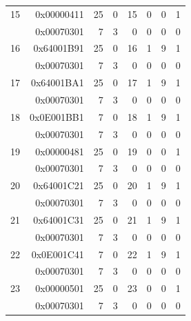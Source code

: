 \begin{longtable}{r r r r r r r r}
15 & 0x00000411 & 25 & 0 & 15 & 0 & 0 & 1 \\
  & 0x00070301 & 7 & 3 & 0 & 0 & 0 & 0 \\
16 & 0x64001B91 & 25 & 0 & 16 & 1 & 9 & 1 \\
  & 0x00070301 & 7 & 3 & 0 & 0 & 0 & 0 \\
17 & 0x64001BA1 & 25 & 0 & 17 & 1 & 9 & 1 \\
  & 0x00070301 & 7 & 3 & 0 & 0 & 0 & 0 \\
18 & 0x0E001BB1 & 7 & 0 & 18 & 1 & 9 & 1 \\
  & 0x00070301 & 7 & 3 & 0 & 0 & 0 & 0 \\
19 & 0x00000481 & 25 & 0 & 19 & 0 & 0 & 1 \\
  & 0x00070301 & 7 & 3 & 0 & 0 & 0 & 0 \\
20 & 0x64001C21 & 25 & 0 & 20 & 1 & 9 & 1 \\
  & 0x00070301 & 7 & 3 & 0 & 0 & 0 & 0 \\
21 & 0x64001C31 & 25 & 0 & 21 & 1 & 9 & 1 \\
  & 0x00070301 & 7 & 3 & 0 & 0 & 0 & 0 \\
22 & 0x0E001C41 & 7 & 0 & 22 & 1 & 9 & 1 \\
  & 0x00070301 & 7 & 3 & 0 & 0 & 0 & 0 \\
23 & 0x00000501 & 25 & 0 & 23 & 0 & 0 & 1 \\
  & 0x00070301 & 7 & 3 & 0 & 0 & 0 & 0 \\


\end{longtable}
